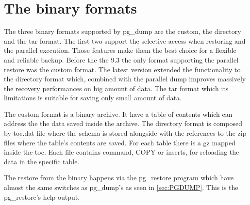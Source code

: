 \section{The binary formats}
\label{sec:PGDUMPBINFMT}
The three binary formats supported by pg\_dump are the custom, the directory and the tar format.
The first two support the selective access when restoring and the parallel execution. Those features
make them the best choice for a flexible and reliable backup. Before the the 9.3 the only format supporting
the parallel restore was the custom format. The latest version extended the functionality to the directory
format which, combined with the parallel dump improves massively the recovery performances on big amount of
data. The tar format which its limitations is suitable for saving only small amount of data. \newline

The custom format is a binary archive. It have a table of contents which can address the the data saved
inside the archive. The directory format is composed by toc.dat file where the schema is stored alongside
with the references to the zip files where the table's contents are saved. For each table there is a gz
mapped inside the toc. Each file contains  command, COPY  or inserts, for reloading the data in the
specific table.\newline


The restore from the binary happens via the pg\_restore program which have almost the same switches
as pg\_dump's as seen in \ref{sec:PGDUMP}. This is the pg\_restore's help output.
\newline


